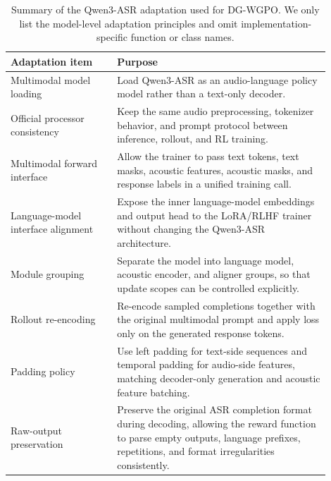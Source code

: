 \documentclass{article}
\begin{document}
\begin{table}[t]
\centering
\small
\caption{
Summary of the Qwen3-ASR adaptation used for DG-WGPO. We only list the
model-level adaptation principles and omit implementation-specific function or
class names.
}
\label{tab:dg_wgpo_asr_adaptation}
\begin{tabular}{p{0.30\linewidth} p{0.60\linewidth}}
\toprule
\textbf{Adaptation item} & \textbf{Purpose} \\
\midrule
Multimodal model loading
& Load Qwen3-ASR as an audio-language policy model rather than a text-only
decoder. \\

Official processor consistency
& Keep the same audio preprocessing, tokenizer behavior, and prompt protocol
between inference, rollout, and RL training. \\

Multimodal forward interface
& Allow the trainer to pass text tokens, text masks, acoustic features, acoustic
masks, and response labels in a unified training call. \\

Language-model interface alignment
& Expose the inner language-model embeddings and output head to the LoRA/RLHF
trainer without changing the Qwen3-ASR architecture. \\

Module grouping
& Separate the model into language model, acoustic encoder, and aligner groups,
so that update scopes can be controlled explicitly. \\

Rollout re-encoding
& Re-encode sampled completions together with the original multimodal prompt and
apply loss only on the generated response tokens. \\

Padding policy
& Use left padding for text-side sequences and temporal padding for audio-side
features, matching decoder-only generation and acoustic feature batching. \\

Raw-output preservation
& Preserve the original ASR completion format during decoding, allowing the
reward function to parse empty outputs, language prefixes, repetitions, and
format irregularities consistently. \\
\bottomrule
\end{tabular}
\vspace{-2mm}
\end{table}
\end{document}
